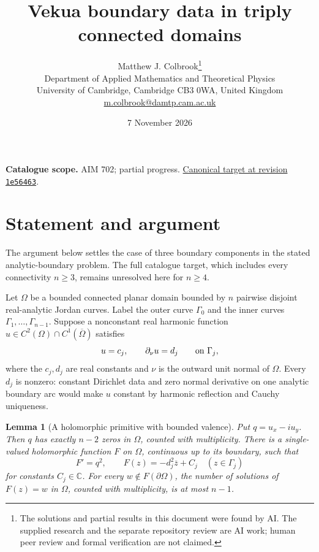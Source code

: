 \documentclass[11pt,a4paper]{article}
\newtheorem{lemma}[theorem]{Lemma}
\theoremstyle{remark}
\begin{document}
\title{Vekua boundary data in triply connected domains}
\author{Matthew J. Colbrook\thanks{The solutions and partial results in this document were found by AI. The supplied research and the separate repository review are AI work; human peer review and formal verification are not claimed.}\\[4pt]
\small Department of Applied Mathematics and Theoretical Physics\\
\small University of Cambridge, Cambridge CB3 0WA, United Kingdom\\
\small\href{mailto:m.colbrook@damtp.cam.ac.uk}{m.colbrook@damtp.cam.ac.uk}}
\date{7 November 2026}
\maketitle
\noindent\textbf{Catalogue scope.} AIM 702; partial progress. \href{https://github.com/MColbrook/AIM/blob/1e564633494c109edfd3ec46da1366adcff925a5/problems/702-vekua-s-harmonic-boundary-problem-in-connectivity-at-least-three.md}{Canonical target at revision \texttt{1e56463}}.


\section{Statement and argument}
\label{sec:702}

The argument below settles the case of three boundary components in
the stated analytic-boundary problem.  The full catalogue target,
which includes every connectivity $n\ge3$, remains unresolved here
for $n\ge4$.

Let $\Omega$ be a bounded connected planar domain bounded by $n$
pairwise disjoint real-analytic Jordan curves.  Label the outer curve
$\Gamma_0$ and the inner curves $\Gamma_1,\ldots,\Gamma_{n-1}$.
Suppose a nonconstant real harmonic function
$u\in C^2(\Omega)\cap C^1(\overline\Omega)$ satisfies
\begin{equation}
 u=c_j,\qquad \partial_\nu u=d_j\qquad\hbox{on }\Gamma_j,
 \label{eq:702-1}
\end{equation}
where the $c_j,d_j$ are real constants and $\nu$ is the outward
unit normal of $\Omega$.
Every $d_j$ is nonzero: constant Dirichlet data and zero normal
derivative on one analytic boundary arc would make $u$ constant by
harmonic reflection and Cauchy uniqueness.

\begin{lemma}[A holomorphic primitive with bounded valence]
Put $q=u_x-iu_y$.  Then $q$ has exactly $n-2$ zeros in $\Omega$,
counted with multiplicity.  There is a single-valued holomorphic
function $F$ on $\Omega$, continuous up to its boundary, such that
\begin{equation}
 F'=q^2,\qquad
 F(z)=-d_j^2\overline z+C_j\quad(z\in\Gamma_j)
 \label{eq:702-2}
\end{equation}
for constants $C_j\in\mathbb C$.
For every $w\notin F(\partial\Omega)$, the number of solutions of
$F(z)=w$ in $\Omega$, counted with multiplicity, is at most $n-1$.
\end{lemma}
\end{document}
